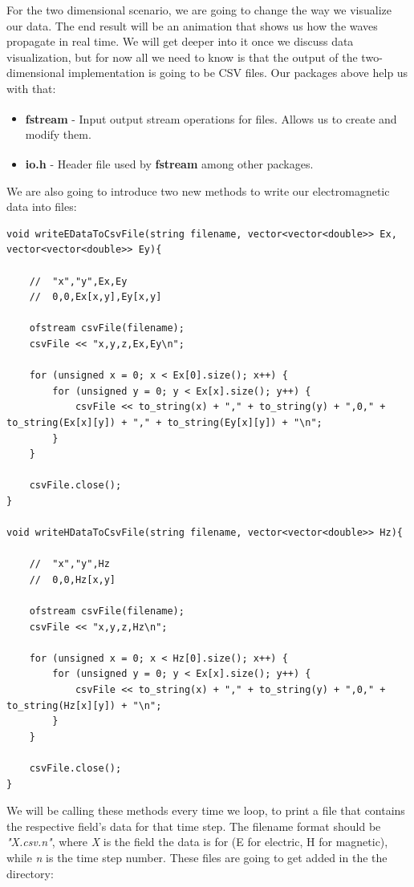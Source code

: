 For the two dimensional scenario, we are going to change the way we visualize our data. The end result will be an animation that shows us how the waves propagate in real time. We will get deeper into it once we discuss data visualization, but for now all we need to know is that the output of the two-dimensional implementation is going to be CSV files. Our packages above help us with that:

\begin{itemize}
	\item \textbf{fstream}\textsuperscript{\cite{fstream}} - Input output stream operations for files. Allows us to create and modify them.
	\item \textbf{io.h}\textsuperscript{\cite{io.h}} - Header file used by \textbf{fstream} among other packages.
\end{itemize}

We are also going to introduce two new methods to write our electromagnetic data into files:

\begin{verbatim}
void writeEDataToCsvFile(string filename, vector<vector<double>> Ex, vector<vector<double>> Ey){
	
	//	"x","y",Ex,Ey
	//	0,0,Ex[x,y],Ey[x,y]
	
	ofstream csvFile(filename);
	csvFile << "x,y,z,Ex,Ey\n";
	
	for (unsigned x = 0; x < Ex[0].size(); x++) {
		for (unsigned y = 0; y < Ex[x].size(); y++) {
			csvFile << to_string(x) + "," + to_string(y) + ",0," + to_string(Ex[x][y]) + "," + to_string(Ey[x][y]) + "\n";
		}
	}
	
	csvFile.close();
}

void writeHDataToCsvFile(string filename, vector<vector<double>> Hz){
	
	//	"x","y",Hz
	//	0,0,Hz[x,y]
	
	ofstream csvFile(filename);
	csvFile << "x,y,z,Hz\n";
	
	for (unsigned x = 0; x < Hz[0].size(); x++) {
		for (unsigned y = 0; y < Ex[x].size(); y++) {
			csvFile << to_string(x) + "," + to_string(y) + ",0," + to_string(Hz[x][y]) + "\n";
		}
	}
	
	csvFile.close();
}
\end{verbatim}

We will be calling these methods every time we loop, to print a file that contains the respective field's data for that time step. The filename format should be \textit{"X.csv.n"}, where \textit{X} is the field the data is for (E for electric, H for magnetic), while \textit{n} is the time step number. These files are going to get added in the the directory: 

